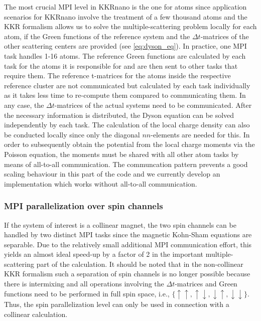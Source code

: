 \documentclass[graybox]{svmult}
\begin{document}
The most crucial MPI level in KKRnano is the one for atoms since application scenarios for KKRnano
involve the treatment of a few thousand atoms and the KKR formalism allows us to solve the
multiple-scattering problem locally for each atom, if the Green functions of the reference system and
the $\Delta t$-matrices of the other scattering centers are provided (see \cref{eq:dyson_eq}).
In practice, one MPI task handles 1-16 atoms.
The reference Green functions are calculated by each task
for the atoms it is responsible for and are then sent to other tasks that require them. 
The reference t-matrices for the atoms inside the respective reference cluster are not communicated 
but calculated by each task individually as it takes less time to re-compute them compared to communicating them.
In any case, the $\Delta t$-matrices of the actual systems need to be communicated.
After the necessary information is distributed, the Dyson equation can be solved independently by each task.
The calculation of the local charge density can also be conducted locally since only the diagonal
$nn$-elements are needed for this.
In order to subsequently obtain the potential from the local charge moments via the Poisson equation,
the moments must be shared with all other atom tasks by means of all-to-all communication.
The communcation pattern prevents a good scaling behaviour in this part of the code and we currently develop
an implementation which works without all-to-all communication.

\subsubsection*{MPI parallelization over spin channels}

If the system of interest is a collinear magnet, the two spin channels can be handled by two distinct
MPI tasks since the
magnetic Kohn-Sham equations are separable.
Due to the relatively small additional MPI communication effort,
this yields an almost ideal speed-up by a factor of 2 in the important
multiple-scattering part of the calculation.
It should be noted that in the non-collinear KKR formalism such a 
separation of spin channels is no longer possible because 
there is intermixing and all operations involving the
$\Delta t$-matrices and Green functions
need to be performed in full spin space, i.e., $\{\uparrow \uparrow, \uparrow \downarrow,
\downarrow \uparrow, \downarrow \downarrow \}$.
Thus, the spin parallelization level can only be used in connection with
a collinear calculation.
\end{document}
